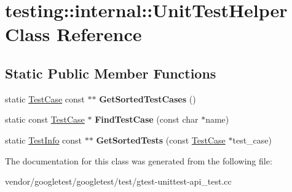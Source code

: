 \hypertarget{classtesting_1_1internal_1_1_unit_test_helper}{}\section{testing\+:\+:internal\+:\+:Unit\+Test\+Helper Class Reference}
\label{classtesting_1_1internal_1_1_unit_test_helper}
\subsection*{Static Public Member Functions}
\begin{DoxyCompactItemize}
\item 
\mbox{\label{classtesting_1_1internal_1_1_unit_test_helper_a9a549307062083d10358638af272cc98}} 
static \hyperlink{classtesting_1_1_test_case}{Test\+Case} const  $\ast$$\ast$ {\bfseries Get\+Sorted\+Test\+Cases} ()
\item 
\mbox{\label{classtesting_1_1internal_1_1_unit_test_helper_a46303cbb7a6abb456f7b1350542113ac}} 
static const \hyperlink{classtesting_1_1_test_case}{Test\+Case} $\ast$ {\bfseries Find\+Test\+Case} (const char $\ast$name)
\item 
\mbox{\label{classtesting_1_1internal_1_1_unit_test_helper_a02602d22fb74566dad78c0c9d4f24e78}} 
static \hyperlink{classtesting_1_1_test_info}{Test\+Info} const  $\ast$$\ast$ {\bfseries Get\+Sorted\+Tests} (const \hyperlink{classtesting_1_1_test_case}{Test\+Case} $\ast$test\+\_\+case)
\end{DoxyCompactItemize}


The documentation for this class was generated from the following file\+:\begin{DoxyCompactItemize}
\item 
vendor/googletest/googletest/test/gtest-\/unittest-\/api\+\_\+test.\+cc\end{DoxyCompactItemize}
